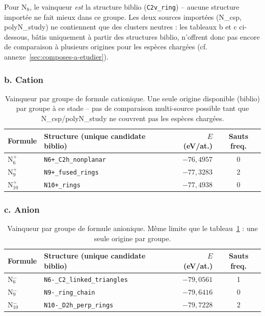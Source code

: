 \documentclass[11pt,a4paper]{article}
\begin{document}
Pour N$_8$, le vainqueur \emph{est} la structure biblio
(\texttt{C2v\_ring}) -- aucune structure import\'ee ne fait mieux dans ce
groupe. Les deux sources import\'ees (N\_csp, polyN\_study) ne contiennent
que des clusters neutres : les tableaux b et c ci-dessous, b\^atis
uniquement \`a partir des structures biblio, n'offrent donc pas encore de
comparaison \`a plusieurs origines pour les esp\`eces charg\'ees (cf.
annexe~\ref{sec:composes-a-etudier}).

\subsubsection{b. Cation}

\begin{table}[H]
\centering
\begin{tabular}{llrc}
\toprule
Formule & Structure (unique candidate biblio) & $E$ (eV/at.) & Sauts freq. \\
\midrule
N$_6^{+}$  & \texttt{N6+\_C2h\_nonplanar} & $-76{,}4957$ & 0 \\
N$_9^{+}$  & \texttt{N9+\_fused\_rings}   & $-77{,}3283$ & 2 \\
N$_{10}^{+}$ & \texttt{N10+\_rings}       & $-77{,}4938$ & 0 \\
\bottomrule
\end{tabular}
\caption{Vainqueur par groupe de formule cationique. Une seule origine
disponible (biblio) par groupe \`a ce stade -- pas de comparaison
multi-source possible tant que N\_csp/polyN\_study ne couvrent pas les
esp\`eces charg\'ees.}
\label{tab:vainqueurs-cation}
\end{table}

\subsubsection{c. Anion}

\begin{table}[H]
\centering
\begin{tabular}{llrc}
\toprule
Formule & Structure (unique candidate biblio) & $E$ (eV/at.) & Sauts freq. \\
\midrule
N$_6^{-}$  & \texttt{N6-\_C2\_linked\_triangles} & $-79{,}0561$ & 1 \\
N$_9^{-}$  & \texttt{N9-\_ring\_chain}            & $-79{,}6416$ & 0 \\
N$_{10}^{-}$ & \texttt{N10-\_D2h\_perp\_rings}    & $-79{,}7228$ & 2 \\
\bottomrule
\end{tabular}
\caption{Vainqueur par groupe de formule anionique. M\^eme limite que le
tableau~\ref{tab:vainqueurs-cation} : une seule origine par groupe.}
\label{tab:vainqueurs-anion}
\end{table}
\end{document}
